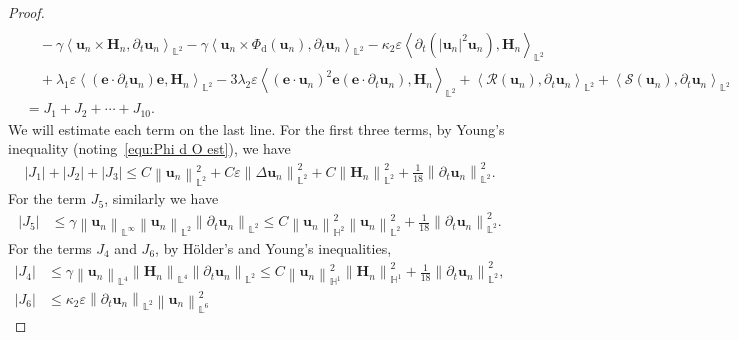 \documentclass[11pt, reqno]{amsart}
\theoremstyle{definition}
\numberwithin{equation}{section}
\newcommand{\bff}{\boldsymbol}
\newcommand{\bb}{\mathbb}
\newcommand{\norm}[2]{\left\|{#1}\right\|_{#2}}
\newcommand{\inpro}[2]{\left\langle#1,#2\right\rangle}
\newcommand{\abs}[1]{\left|{#1}\right|}
\begin{document}
\begin{proof}
\begin{align}
        \nonumber \\
        &\quad
        -
		\gamma \inpro{\bff{u}_n \times \bff{H}_n}{\partial_t \bff{u}_n}_{\bb{L}^2}
        -
        \gamma \inpro{\bff{u}_n \times \Phi_{\mathrm{d}}(\bff{u}_n)}{\partial_t \bff{u}_n}_{\bb{L}^2}
		-
		\kappa_2 \varepsilon \inpro{\partial_t (|\bff{u}_n|^2 \bff{u}_n)}{\bff{H}_n}_{\bb{L}^2}
        \nonumber \\
        &\quad
		+
		\lambda_1 \varepsilon \inpro{(\bff{e}\cdot\partial_t \bff{u}_n)\bff{e}}{\bff{H}_n}_{\bb{L}^2}
        -
        3\lambda_2\varepsilon \inpro{(\bff{e}\cdot \bff{u}_n)^2 \bff{e}(\bff{e}\cdot \partial_t \bff{u}_n)}{\bff{H}_n}_{\bb{L}^2}
        +
        \inpro{\mathcal{R}(\bff{u}_n)}{\partial_t\bff{u}_n}_{\bb{L}^2}
        +
        \inpro{\mathcal{S}(\bff{u}_n)}{\partial_t\bff{u}_n}_{\bb{L}^2}
        \nonumber \\
        &=
        J_1+J_2+\cdots+J_{10}.
	\end{align}
    We will estimate each term on the last line. For the first three terms, by Young's inequality (noting~\eqref{equ:Phi d O est}), we have
    \begin{align*}
        \abs{J_1}+\abs{J_2}+\abs{J_3}
        \leq
        C\norm{\bff{u}_n}{\bb{L}^2}^2
        +
        C\varepsilon \norm{\Delta \bff{u}_n}{\bb{L}^2}^2
        +
        C\norm{\bff{H}_n}{\bb{L}^2}^2
        +
        \frac{1}{18} \norm{\partial_t \bff{u}_n}{\bb{L}^2}^2.
    \end{align*}
    For the term $J_5$, similarly we have
    \begin{align*}
        \abs{J_5}
        &\leq
        \gamma \norm{\bff{u}_n}{\bb{L}^\infty} \norm{\bff{u}_n}{\bb{L}^2} \norm{\partial_t \bff{u}_n}{\bb{L}^2}
        \leq
        C \norm{\bff{u}_n}{\bb{H}^2}^2 \norm{\bff{u}_n}{\bb{L}^2}^2
        +
        \frac{1}{18} \norm{\partial_t \bff{u}_n}{\bb{L}^2}^2.
    \end{align*}
    For the terms $J_4$ and $J_6$, by H\"older's and Young's inequalities,
    \begin{align*}
        \abs{J_4}
        &\leq
        \gamma \norm{\bff{u}_n}{\bb{L}^4}
		\norm{\bff{H}_n}{\bb{L}^4}
		\norm{\partial_t \bff{u}_n}{\bb{L}^2}
        \leq
        C\norm{\bff{u}_n}{\bb{H}^1}^2
		\norm{\bff{H}_n}{\bb{H}^1}^2
        +
        \frac{1}{18} \norm{\partial_t \bff{u}_n}{\bb{L}^2}^2,
        \\
        \abs{J_6}
        &\leq
        \kappa_2 \varepsilon \norm{\partial_t \bff{u}_n}{\bb{L}^2}
		\norm{\bff{u}_n}{\bb{L}^6}^2

\end{align*}
\end{proof}
\end{document}
